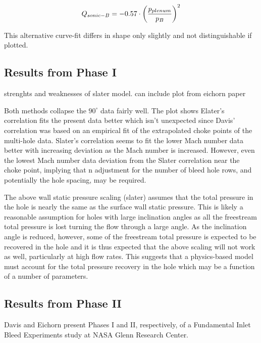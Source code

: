 $$ Q_{sonic-B} = -0.57 \cdot \qty(\frac{p_{plenum}}{p_B})^2 $$

This alternative curve-fit differs in shape only slightly and not distinguishable if plotted.








\subsection{Results from Phase I}
strenghts and weaknesses of slater model. can include plot from eichorn paper

Both methods collapse the $90^\circ$ data fairly well. The plot shows Elater's correlation fits the present data better which isn't unexpected since Davis' correlation was based on an empirical fit of the extrapolated choke points of the multi-hole data. Slater's correlation seems to fit the lower Mach number data better with increasing deviation as the Mach number is increased. However, even the lowest Mach number data deviation from the Slater correlation near the choke point, implying that n adjustment for the number of bleed hole rows, and potentially the hole spacing, may be required.

The above wall static pressure scaling (slater) assumes that the total pressure in the hole is nearly the same as the surface wall static pressure. This is likely a reasonable assumption for holes with large inclination angles as all the freestream total pressure is lost turning the flow through a large angle. As the inclination angle is reduced, however, some of the freestream total pressure is expected to be recovered in the hole and it is thus expected that the above scaling will not work as well, particularly at high flow rates. This suggests that a physics-based model must account for the total pressure recovery in the hole which may be a function of a number of parameters.

\subsection{Results from Phase II}
Davis \cite{Davis2012} and Eichorn \cite{Eichorn2013} present Phases I and II, respectively, of a Fundamental Inlet Bleed Experiments study at NASA Glenn Research Center.


